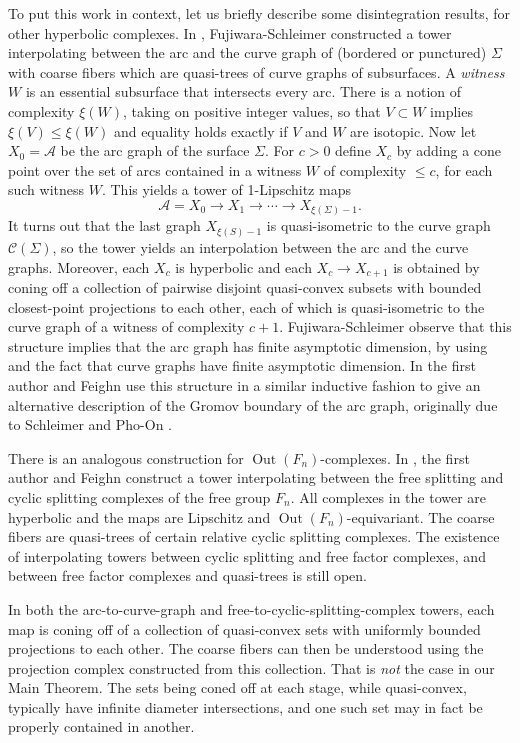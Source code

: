 \documentclass[11pt]{article}
\theoremstyle{remark}
\def\C{{\mathcal C}}
\def\Out{\operatorname{Out}}
\begin{document}
To put this work in context, let us briefly describe some
disintegration results, for other hyperbolic complexes. In \cite{FS},
Fujiwara-Schleimer constructed a tower interpolating between the arc
and the curve graph of (bordered or punctured) $\Sigma$ with coarse
fibers which are quasi-trees of curve graphs of subsurfaces.
A \emph{witness}
$W$ is an essential subsurface that intersects every arc.
There is a notion
of complexity $\xi(W)$, taking on positive integer values, so that $V\subset W$
implies $\xi(V)\leq \xi(W)$ and equality holds exactly if $V$ and $W$ are
isotopic. Now let $X_0=\mathcal A$ be the arc graph of the surface
$\Sigma$. For $c>0$ define $X_c$ by adding a cone point over
the set of arcs contained
in a witness $W$ of complexity $\leq c$, for each such witness $W$.
This yields a tower of 1-Lipschitz maps
$$\mathcal A=X_0\to X_1\to\cdots\to X_{\xi(\Sigma)-1}.$$ It turns out
that the last graph $X_{\xi(S)-1}$ is quasi-isometric to the curve
graph $\C(\Sigma)$, so the tower yields an interpolation between the arc
and the curve graphs. Moreover, each $X_c$ is hyperbolic and each
$X_c\to X_{c+1}$ is obtained by coning off a collection
of pairwise disjoint quasi-convex subsets with bounded closest-point
projections to
each other, each of which is quasi-isometric to the curve graph of a witness
of complexity $c+1$. Fujiwara-Schleimer observe that this structure
implies that the arc graph has finite asymptotic dimension, by using
\cite{Hurewicz} and the fact that curve graphs have finite asymptotic
dimension. In \cite{bf:boundary} the first author and Feighn use this structure in
a similar inductive fashion to give an alternative description of the
Gromov boundary of the arc graph, originally due to Schleimer and
Pho-On \cite{PhoOn}.

There is an analogous construction for $\Out(F_n)$-complexes. In
\cite{bf:boundary}, the first author and Feighn construct a tower interpolating
between the free splitting and cyclic splitting complexes of the free
group $F_n$. All complexes in the tower are hyperbolic and the maps are
Lipschitz and $\Out(F_n)$-equivariant. The coarse fibers are
quasi-trees of certain relative cyclic splitting
complexes. The existence of interpolating towers between cyclic
splitting and free factor complexes, and between free factor complexes
and quasi-trees is still open.

In both the arc-to-curve-graph and free-to-cyclic-splitting-complex towers,
each map is coning off of a collection of
quasi-convex sets with uniformly bounded projections to each
other. The coarse fibers can then be understood using the projection
complex \cite{BBF} constructed from this collection. That is \emph{not} the
case in our Main Theorem. The sets being coned off at each stage,
while quasi-convex, typically have infinite diameter
intersections, and one such set may in fact be properly
contained in another.
\end{document}
